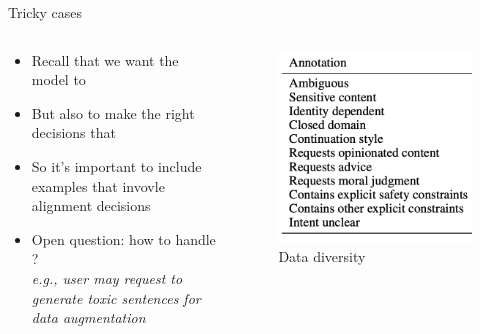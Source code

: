 \documentclass[usenames,dvipsnames,notes,11pt,aspectratio=169,hyperref={colorlinks=true, linkcolor=blue}]{beamer}
\begin{document}
\begin{frame}
    {Tricky cases}

    \begin{columns}
        \begin{column}{0.6\textwidth}
            \begin{itemize}
                \item Recall that we want the model to 
                \item But also to make the right decisions that 
                \item So it's important to include examples that invovle alignment decisions
                    \pause
                \item Open question: how to handle ?\\
                    {\em e.g., user may request to generate toxic sentences for data augmentation}
            \end{itemize}
        \end{column}
        \begin{column}{0.4\textwidth}
            \begin{figure}
        \includegraphics[width=\textwidth]{figures/prompt-diversity}
            \caption{Data diversity}
            \end{figure}
        \end{column}
    \end{columns}
\end{frame}
\end{document}
